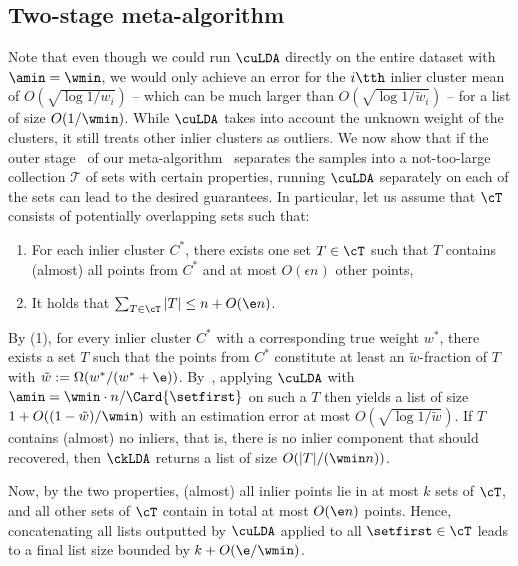 \subsection{Two-stage meta-algorithm}
\label{sec:optimal_two_stage}

Note that even though we could run $\cuLDA$ directly on the entire dataset with $\amin = \wmin$, we would only achieve  an error for the $i\tth$ inlier cluster mean of
$O(\sqrt{\log 1/w_i})$ -- which can be much larger than $O(\sqrt{\log 1/\tilde{w}_i})$ -- for a list of size $O(1 / \wmin)$.
While $\cuLDA$ takes into account the unknown weight of the clusters, it still treats other inlier clusters as outliers.
We now show that if the outer stage~ of our meta-algorithm~
separates the samples into a not-too-large collection  $\mathcal T$ of sets with certain properties, running $\cuLDA$ separately on each of the sets can lead to the desired guarantees.
In particular, let us assume that 
\(\cT\) consists of potentially overlapping sets such that:
\begin{enumerate}[(1)
]
\item For each inlier cluster $C^*$, there exists one set $T \in \cT$ such that $T$ contains (almost) all points from $C^*$ and at most $O(\epsilon n)$ other points,
\item It holds that $\sum_{T\in \cT} |T| \leq n + O(\e n)$.
\end{enumerate}

By (1), for every inlier cluster $C^*$  with a corresponding true weight 
$w^*$, there exists a set $T$ such that the points from $C^*$ constitute at least an $\tilde w$-fraction of $T$ with $\tilde w := \Omega(w^* / (w^*+\e))$.
By~, applying $\cuLDA$ with ${\amin = \wmin \cdot n / \Card{\setfirst}}$ on such a $T$ then yields a list of size  %
$1 +O((1-\tilde{w}) / \wmin)$ with an estimation error at most $O(\sqrt{\log 1/ {\tilde{w}}})$.
If $T$ contains (almost) no inliers, that is, there is no inlier component that should recovered, 
then $\ckLDA$ returns a list of size $O(|T| / (\wmin n))$. %

Now, by the two properties, (almost) all inlier points lie in at most $k$ sets of $\cT$, and all other sets of $\cT$ contain in total at most $O(\e n)$ points.
Hence, concatenating all lists outputted by $\cuLDA$ applied to all $\setfirst \in \cT$ 
leads to a final list size bounded by $k + O(\e / \wmin)$.

